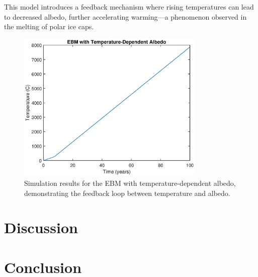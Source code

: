 \documentclass[12pt]{article}
\begin{document}
This model introduces a feedback mechanism 
where rising temperatures can lead to decreased albedo, 
further accelerating warming—a phenomenon observed 
in the melting of polar ice caps. 

\begin{figure}[ht]
\centering
\includegraphics[width=0.8\textwidth]{temperature_dependent_albedo.eps}
\caption{Simulation results for the EBM with temperature-dependent albedo, demonstrating the feedback loop between temperature and albedo.}
\label{fig:tempDepAlbedo}
\end{figure}


\section{Discussion}

\section{Conclusion}
\end{document}
